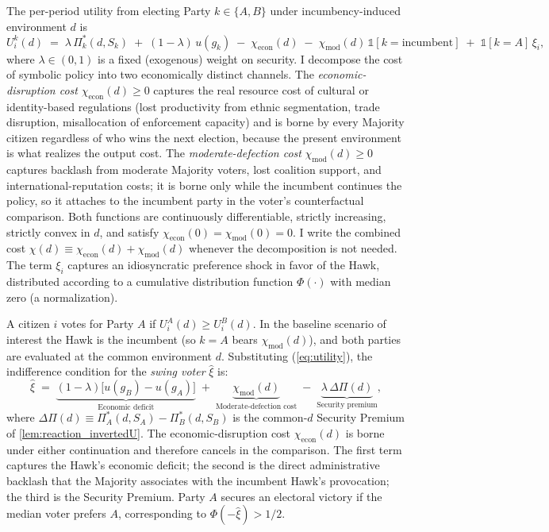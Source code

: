 \documentclass[11pt,twoside]{extarticle}
\begin{document}
The per-period utility from electing Party $k\in\{A,B\}$ under incumbency-induced environment $d$ is
\begin{equation} \label{eq:utility}
U_i^k(d) \;=\; \lambda\,\Pi_k^*(d,S_k) \;+\; (1-\lambda)\,u(g_k) \;-\; \chi_{\mathrm{econ}}(d) \;-\; \chi_{\mathrm{mod}}(d)\,\mathbb{1}[k=\text{incumbent}] \;+\; \mathbb{1}[k=A]\,\xi_i,
\end{equation}
where $\lambda\in(0,1)$ is a fixed (exogenous) weight on security. I decompose the cost of symbolic policy into two economically distinct channels. The \emph{economic-disruption cost} $\chi_{\mathrm{econ}}(d)\ge 0$ captures the real resource cost of cultural or identity-based regulations (lost productivity from ethnic segmentation, trade disruption, misallocation of enforcement capacity) and is borne by every Majority citizen regardless of who wins the next election, because the present environment is what realizes the output cost. The \emph{moderate-defection cost} $\chi_{\mathrm{mod}}(d)\ge 0$ captures backlash from moderate Majority voters, lost coalition support, and international-reputation costs; it is borne only while the incumbent continues the policy, so it attaches to the incumbent party in the voter's counterfactual comparison. Both functions are continuously differentiable, strictly increasing, strictly convex in $d$, and satisfy $\chi_{\mathrm{econ}}(0)=\chi_{\mathrm{mod}}(0)=0$. I write the combined cost $\chi(d)\equiv\chi_{\mathrm{econ}}(d)+\chi_{\mathrm{mod}}(d)$ whenever the decomposition is not needed. The term $\xi_i$ captures an idiosyncratic preference shock in favor of the Hawk, distributed according to a cumulative distribution function $\Phi(\cdot)$ with median zero (a normalization).

A citizen $i$ votes for Party $A$ if $U_i^A(d)\ge U_i^B(d)$. In the baseline scenario of interest the Hawk is the incumbent (so $k=A$ bears $\chi_{\mathrm{mod}}(d)$), and both parties are evaluated at the common environment $d$. Substituting (\ref{eq:utility}), the indifference condition for the \textit{swing voter} $\hat{\xi}$ is:
\begin{equation} \label{eq:swing}
\hat{\xi} \;=\;
\underbrace{(1-\lambda)\big[u(g_B)-u(g_A)\big]}_{\text{Economic deficit}}
\;+\;
\underbrace{\chi_{\mathrm{mod}}(d)}_{\text{Moderate-defection cost}}
\;-\;
\underbrace{\lambda\,\Delta\Pi(d)}_{\text{Security premium}},
\end{equation}
where $\Delta\Pi(d)\equiv\Pi_A^*(d,S_A)-\Pi_B^*(d,S_B)$ is the common-$d$ Security Premium of \autoref{lem:reaction_invertedU}. The economic-disruption cost $\chi_{\mathrm{econ}}(d)$ is borne under either continuation and therefore cancels in the comparison. The first term captures the Hawk's economic deficit; the second is the direct administrative backlash that the Majority associates with the incumbent Hawk's provocation; the third is the Security Premium. Party $A$ secures an electoral victory if the median voter prefers $A$, corresponding to $\Phi(-\hat{\xi})>1/2$.
\end{document}
